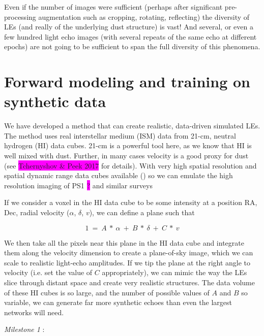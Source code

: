 \documentclass{proposalnsf}
\newcommand{\changeit}[1]{\colorbox{magenta}{#1}}
\begin{document}
Even if the number of images were sufficient (perhaps after significant pre-processing augmentation such as cropping, rotating, reflecting) the diversity of LEs (and really of the underlying dust structure) is vast! And several, or even a few hundred light echo images (with several repeats of the same echo at different epochs) are not going to be sufficient to span the full diversity of this phenomena.  



\section{Forward modeling and training on synthetic data}\label{sec:fwm}


We have developed a method that can create realistic, data-driven simulated LEs.  The method uses real interstellar medium (ISM) data from 21-cm, neutral hydrogen (HI) data cubes.  21-cm is a powerful tool here, as we know that HI is well mixed with dust.  Further, in many cases velocity is a good proxy for dust (see \changeit{Tchernyshov & Peek 2017} for details).  With very high spatial resolution and spatial dynamic range data cubes available () so we can emulate the high resolution imaging of PS1 \changeit{?} and similar surveys

If we consider a voxel in the HI data cube to be some intensity at a position RA, Dec, radial velocity ($\alpha$, $\delta$, $v$), we can define a plane such that 

$$1~=~A~*~\alpha~+~B~*~\delta~+~C~*~v$$

We then take all the pixels near this plane in the HI data cube and integrate them along the velocity dimension to create a plane-of-sky image, which we can scale to realistic light-echo amplitudes.  If we tip the plane at the right angle to velocity (i.e.  set the value of $C$ appropriately), we can mimic the way the LEs slice through distant space and create very realistic structures.  The data volume of these HI cubes is so large, and the number of possible values of $A$ and $B$ so variable, we can generate far more synthetic echoes than even the largest networks will need.  

\emph{Milestone 1} :
\end{document}
